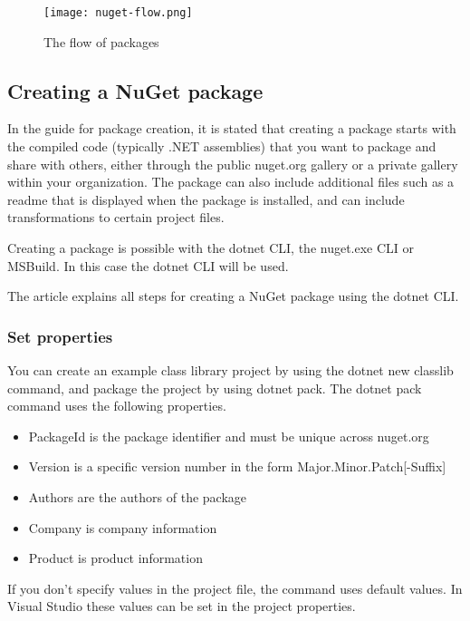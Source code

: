 \begin{figure}
    \centering
    \texttt{[image: nuget-flow.png]}
    \caption{The flow of packages}
    \label{fig:nuget-flow}
\end{figure}

\subsection{Creating a NuGet package}

In the \textcite{Microsoft2022a} guide for package creation, it is stated that creating a package starts with the compiled code (typically .NET assemblies) that you want to package and share with others, either through the public nuget.org gallery or a private gallery within your organization. The package can also include additional files such as a readme that is displayed when the package is installed, and can include transformations to certain project files.

Creating a package is possible with the dotnet CLI, the nuget.exe CLI or MSBuild. In this case the dotnet CLI will be used.

The \textcite{Microsoft2022b} article explains all steps for creating a NuGet package using the dotnet CLI.

\subsubsection{Set properties}

You can create an example class library project by using the dotnet new classlib command, and package the project by using dotnet pack. The dotnet pack command uses the following properties.

\begin{itemize}
    \item PackageId is the package identifier and must be unique across nuget.org
    \item Version is a specific version number in the form Major.Minor.Patch[-Suffix]
    \item Authors are the authors of the package
    \item Company is company information
    \item Product is product information
\end{itemize}

If you don't specify values in the project file, the command uses default values. In Visual Studio these values can be set in the project properties.

